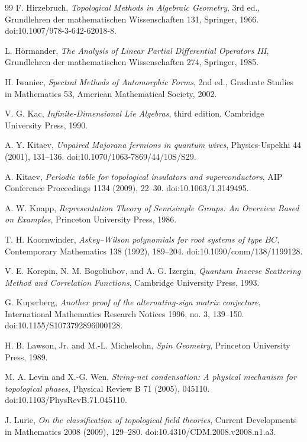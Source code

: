 \documentclass[11pt]{article}
\theoremstyle{definition}
\begin{document}
\begin{thebibliography}{99}
F. Hirzebruch,
\emph{Topological Methods in Algebraic Geometry}, 3rd ed.,
Grundlehren der mathematischen Wissenschaften 131, Springer, 1966.
doi:10.1007/978-3-642-62018-8.

L. H\"ormander,
\emph{The Analysis of Linear Partial Differential Operators III},
Grundlehren der mathematischen Wissenschaften 274, Springer, 1985.

H. Iwaniec,
\emph{Spectral Methods of Automorphic Forms}, 2nd ed.,
Graduate Studies in Mathematics 53,
American Mathematical Society, 2002.

V. G. Kac,
\emph{Infinite-Dimensional Lie Algebras}, third edition,
Cambridge University Press, 1990.

A. Y. Kitaev,
\emph{Unpaired Majorana fermions in quantum wires},
Physics-Uspekhi 44 (2001), 131--136.
doi:10.1070/1063-7869/44/10S/S29.

A. Kitaev,
\emph{Periodic table for topological insulators and superconductors},
AIP Conference Proceedings 1134 (2009), 22--30.
doi:10.1063/1.3149495.

A. W. Knapp,
\emph{Representation Theory of Semisimple Groups: An Overview Based on
Examples},
Princeton University Press, 1986.

T. H. Koornwinder,
\emph{Askey--Wilson polynomials for root systems of type $BC$},
Contemporary Mathematics 138 (1992), 189--204.
doi:10.1090/conm/138/1199128.

V. E. Korepin, N. M. Bogoliubov, and A. G. Izergin,
\emph{Quantum Inverse Scattering Method and Correlation Functions},
Cambridge University Press, 1993.

G. Kuperberg,
\emph{Another proof of the alternating-sign matrix conjecture},
International Mathematics Research Notices 1996, no. 3, 139--150.
doi:10.1155/S1073792896000128.

H. B. Lawson, Jr. and M.-L. Michelsohn,
\emph{Spin Geometry},
Princeton University Press, 1989.

M. A. Levin and X.-G. Wen,
\emph{String-net condensation: A physical mechanism for topological
phases},
Physical Review B 71 (2005), 045110.
doi:10.1103/PhysRevB.71.045110.

J. Lurie,
\emph{On the classification of topological field theories},
Current Developments in Mathematics 2008 (2009), 129--280.
doi:10.4310/CDM.2008.v2008.n1.a3.


\end{thebibliography}
\end{document}
